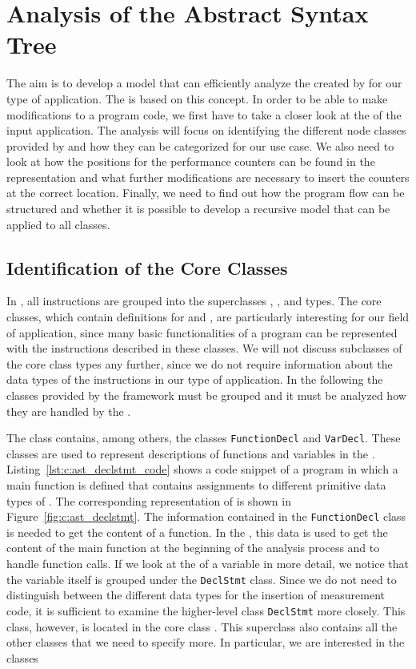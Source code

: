 \chapter{Analysis of the Abstract Syntax Tree}
\label{chapter3}
The aim is to develop a model that can efficiently analyze the \astsmall created by \CLANG for our type of application. The \TOOL is based on this concept. In order to be able to make modifications to a program code, we first have to take a closer look at the \astsmall of the input application. The analysis will focus on identifying the different node classes provided by \CLANG and how they can be categorized for our use case. We also need to look at how the positions for the performance counters can be found in the representation and what further modifications are necessary to insert the counters at the correct location. Finally, we need to find out how the program flow can be structured and whether it is possible to develop a recursive model that can be applied to all classes.

\section{Identification of the Core Classes}
In \CLANG, all instructions are grouped into the superclasses \declssmall, \STATS, and types. The core classes, which contain definitions for \declssmall and \STATS, are particularly interesting for our field of application, since many basic functionalities of a program can be represented with the instructions described in these classes. We will not discuss subclasses of the core class types any further, since we do not require information about the data types of the instructions in our type of application. In the following the classes provided by the \CLANG framework must be grouped and it must be analyzed how they are handled by the \TOOL. 

The \declssmall class contains, among others, the classes \lstinline{FunctionDecl} and \lstinline{VarDecl}. These classes are used to represent descriptions of functions and variables in the \astsmall. Listing~\ref{lst:c:ast_declstmt_code} shows a code snippet of a program in which a main function is defined that contains assignments to different primitive data types of \CPP. The corresponding \astsmall representation of \CLANG is shown in Figure~\ref{fig:c:ast_declstmt}. The information contained in the \lstinline{FunctionDecl} class is needed to get the content of a function. In the \TOOL, this data is used to get the content of the main function at the beginning of the analysis process and to handle function calls. If we look at the \DECL of a variable in more detail, we notice that the variable \DECL itself is grouped under the \lstinline{DeclStmt} class. Since we do not need to distinguish between the different data types for the insertion of measurement code, it is sufficient to examine the higher-level class \lstinline{DeclStmt} more closely. This class, however, is located in the core class \STATS. This superclass also contains all the other classes that we need to specify more. In particular, we are interested in the classes


